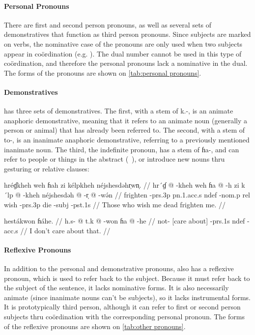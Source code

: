 \paragraph{Personal Pronouns} There are first and second person pronouns, as
well as several sets of demonstratives that function as third person pronouns.
Since subjects are marked on verbs, the nominative case of the pronouns are
only used when two subjects appear in coördination (e.g. ). The dual number cannot be used in this type of coördination, and
therefore the personal pronouns lack a nominative in the dual. The forms of the
pronouns are shown on \cref{tab:personal pronouns}.

\paragraph{Demonstratives} \Langname{} has three sets of demonstratives. The
first, with a stem of {\ll k.-}, is an animate anaphoric demonstrative, meaning
that it refers to an animate noun (generally a person or animal) that has
already been referred to. The second, with a stem of {\ll to-}, is an
inanimate anaphoric demonstrative, referring to a previously mentioned
inanimate noun. The third, the indefinite pronoun, has a stem of {\ll ɦa-}, and
can refer to people or things in the abstract (\ie\ ), or introduce
new nouns thru gesturing or relative clauses:

\pex
\a
\begingl
\glpreamble hréɠkheh weh ɦah zi kélpkheh néjshesdəhr̩wn̩. //
\gla hr´ɠ @ -kheh weh ɦa @ -h zi k´lp @ -kheh néjshesdəh @ -r̩ @
-wə́n //
\glb frighten -{\sc prs}.3p {\sc pn}.1.{\sc acc}.s {\sc ndef} -{\sc nom}.p {\sc
    rel} wish -{\sc prs}.3p die -{\sc subj} -{\sc pst}.1s //
\glft Those who wish me dead frighten me. //
\endgl

\a
\begingl
    \glpreamble hestákwon ɦáhe. //
    \gla h.s- @ t.k @ -won ɦa @ -he //
    \glb not- {[care about]} -{\sc prs}.1s {\sc ndef} -{\sc acc}.s //
    \glft I don't care about that. //
\endgl
\xe

\paragraph{Reflexive Pronouns} In addition to the personal and demonstrative
pronouns, \Langname{} also has a reflexive pronoun, which is used to
refer back to the subject. Because it must refer back to the subject of the
sentence, it lacks nominative forms. It is also necessarily animate (since
inanimate nouns can't be subjects), so it lacks instrumental forms. It is
prototypically third person, although it can refer to first or second person
subjects thru coördination with the corresponding personal pronoun. The forms
of the reflexive pronouns are shown on \cref{tab:other pronouns}.

